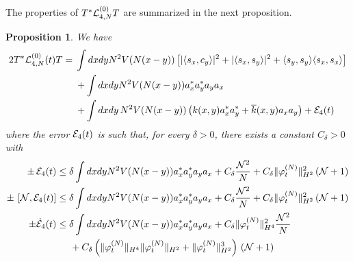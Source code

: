 \documentclass[11pt,a4paper]{article}
\newtheorem{proposition}[thm]{Proposition}
\newcommand{\cE}{{\cal E}}
\newcommand{\cL}{{\cal L}}
\newcommand{\cN}{{\cal N}}
\begin{document}
The properties of $T^* \cL^{(0)}_{4,N} T$ are summarized in the next proposition. 
\begin{proposition}\label{prop:TL4T}
We have 
\begin{equation}\begin{split} 2 T^* \cL_{4,N}^{(0)} (t) T =\; & \int dx dy N^2 V (N (x-y)) \left[ |\langle s_x , c_y \rangle|^2  +  |\langle s_x , s_y \rangle|^2   + \langle s_y , s_y \rangle \langle s_x ,s_x \rangle \right] \\  &+ \int dx dy N^2 V (N (x-y)) a_x^* a_y^* a_y a_x \\ &+ \int dx dy \, N^2 V (N (x-y)) \left( k (x,y) a^*_x a^*_y + \overline{k} (x,y) a_x a_y \right) + \cE_4 (t) \end{split} \end{equation}
where the error $\cE_4 (t)$ is such that, for every $\delta > 0$, there exists a constant $C_\delta > 0$ with  
\begin{equation}\label{eq:TL4T-cl} 
\begin{split}
\pm \, \cE_4 (t) &\leq \delta \int dx dy N^2 V(N (x-y)) a_x^* a_y^* a_y a_x + C_\delta  \frac{\cN^2}{N}  + C_\delta \| \varphi_t^{(N)} \|_{H^2}^2 \left(\cN + 1 \right) \\
\pm \, \left[ \cN , \cE_4 (t) \right]  &\leq  \delta \int dx dy N^2 V(N (x-y)) a_x^* a_y^* a_y a_x + C_\delta \frac{\cN^2}{N} + C_\delta \| \varphi_t^{(N)} \|_{H^2}^2 \left(\cN + 1 \right) \\
\pm \dot{\cE}_4 (t) &\leq 
\delta \int dx dy N^2 V(N (x-y)) a_x^* a_y^* a_y a_x + C_\delta \| \varphi_t^{(N)} \|_{H^4}^2  \frac{\cN^2}{N} \\ &\hspace{.5cm} + C_\delta \left(\| \varphi_t^{(N)} \|_{H^4} \| \varphi_t^{(N)} \|_{H^2} + \| \varphi_t^{(N)} \|_{H^2}^3 \right) \, \left(\cN + 1 \right)
\end{split}
\end{equation}
\end{proposition}
\end{document}

